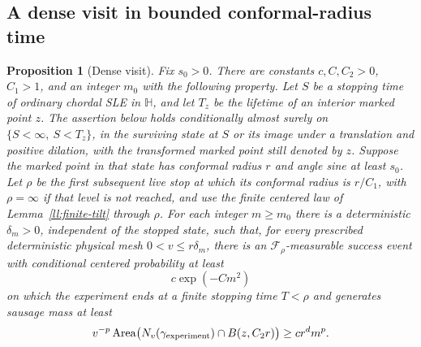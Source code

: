 \documentclass[11pt]{article}
\newtheorem{proposition}[theorem]{Proposition}
\theoremstyle{definition}
\theoremstyle{remark}
\numberwithin{equation}{section}
\begin{document}
\subsection{A dense visit in bounded conformal-radius time}

\begin{proposition}[Dense visit]\label{rc:dense}
Fix $s_0>0$. There are constants $c,C,C_2>0$, $C_1>1$, and an integer
$m_0$ with the following property. Let $S$ be a stopping time of ordinary
chordal SLE in $\mathbb H$, and let $T_z$ be the lifetime of an interior
marked point $z$. The assertion below holds conditionally almost surely
on $\{S<\infty,\ S<T_z\}$, in the surviving state at $S$ or its image
under a translation and positive dilation, with the transformed marked
point still denoted by $z$.
Suppose the marked point in that state has conformal radius $r$ and angle
sine at least $s_0$. Let $\rho$ be the first subsequent live stop at which
its conformal radius is $r/C_1$, with $\rho=\infty$ if that level is not
reached, and use the finite centered law of Lemma~\ref{ll:finite-tilt}
through $\rho$. For each integer $m\ge m_0$ there is a deterministic
$\delta_m>0$, independent of the stopped state, such that, for every
prescribed deterministic physical mesh $0<v\le r\delta_m$, there is an
$\mathcal F_\rho$-measurable success event with conditional centered
probability at least
\begin{equation}\label{rc:dense-probability}
 c\exp(-Cm^2)
\end{equation}
on which the experiment ends at a finite stopping time $T<\rho$ and
generates sausage mass at least
\begin{equation}\label{rc:dense-mass}
 v^{-p}\operatorname{Area}
  \bigl(N_v(\gamma_{\rm experiment})\cap B(z,C_2r)\bigr)
       \ge c r^d m^p.
\end{equation}
\end{proposition}
\end{document}
